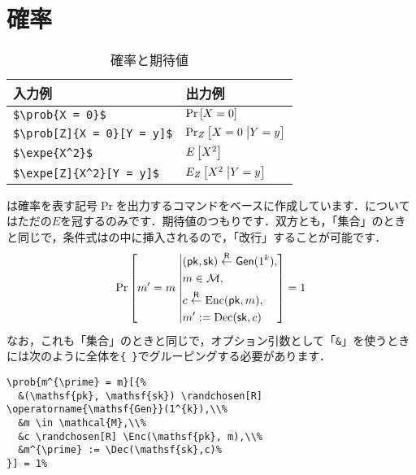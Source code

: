 \documentclass[uplatex]{jsreport}
\begin{document}
\section{確率}
\begin{table}[htbp]
  \centering
  \caption{確率と期待値}
  \label{table:2.prob}
  \begin{tabular}{ll}\hline
    入力例 & 出力例 \\ \hline
    \verb|$\prob{X = 0}$| & $\prob{X = 0}$\\
    \verb|$\prob[Z]{X = 0}[Y = y]$| & $\prob[Z]{X = 0}[Y = y]$\\
    \verb|$\expe{X^2}$| & $\expe{X^2}$\\
    \verb|$\expe[Z]{X^2}[Y = y]$| & $\expe[Z]{X^2}[Y = y]$\\\hline
  \end{tabular}
\end{table}\par
{}は確率を表す記号$\Pr$を出力するコマンドをベースに作成しています．についてはただの$E$を冠するのみです．期待値のつもりです．双方とも，「集合」のときと同じで，条件式はの中に挿入されるので，「改行」することが可能です．
\begin{align*}
  \prob{m^{\prime} = m}[{%
    &(\mathsf{pk}, \mathsf{sk}) \randchosen[R] \operatorname{\mathsf{Gen}}(1^{k}),\\
    &m \in \mathcal{M},\\
    &c \randchosen[R] \Enc(\mathsf{pk}, m),\\
    &m^{\prime} := \Dec(\mathsf{sk},c)
  }] = 1
\end{align*}
なお，これも「集合」のときと同じで，オプション引数として「\verb|&|」を使うときには次のように全体を\verb|{ }|でグルーピングする必要があります．
\begin{verbatim}
\prob{m^{\prime} = m}[{%
  &(\mathsf{pk}, \mathsf{sk}) \randchosen[R] \operatorname{\mathsf{Gen}}(1^{k}),\\%
  &m \in \mathcal{M},\\%
  &c \randchosen[R] \Enc(\mathsf{pk}, m),\\%
  &m^{\prime} := \Dec(\mathsf{sk},c)%
}] = 1%
\end{verbatim}
\par
\end{document}
